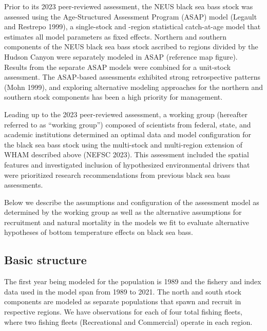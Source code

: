 \documentclass[
]{article}
\begin{document}
Prior to its 2023 peer-reviewed assessment, the NEUS black sea bass
stock was assessed using the Age-Structured Assessment Program (ASAP)
model (Legault and Restrepo 1999), a single-stock and -region
statistical catch-at-age model that estimates all model parameters as
fixed effects. Northern and southern components of the NEUS black sea
bass stock ascribed to regions divided by the Hudson Canyon were
separately modeled in ASAP (reference map figure). Results from the
separate ASAP models were combined for a unit-stock assessment. The
ASAP-based assessments exhibited strong retrospective patterns (Mohn
1999), and exploring alternative modeling approaches for the northern
and southern stock components has been a high priority for management.

Leading up to the 2023 peer-reviewed assessment, a working group
(hereafter referred to as ``working group'') composed of scientists from
federal, state, and academic institutions determined an optimal data and
model configuration for the black sea bass stock using the multi-stock
and multi-region extension of WHAM described above (NEFSC 2023). This
assessment included the spatial features and investigated inclusion of
hypothesized environmental drivers that were prioritized research
recommendations from previous black sea bass assessments.

Below we describe the assumptions and configuration of the assessment
model as determined by the working group as well as the alternative
assumptions for recruitment and natural mortality in the models we fit
to evaluate alternative hypotheses of bottom temperature effects on
black sea bass.

\hypertarget{basic-structure}{%
\subsection*{Basic structure}\label{basic-structure}}

The first year being modeled for the population is 1989 and the fishery
and index data used in the model span from 1989 to 2021. The north and
south stock components are modeled as separate populations that spawn
and recruit in respective regions. We have observations for each of four
total fishing fleets, where two fishing fleets (Recreational and
Commercial) operate in each region.
\end{document}
